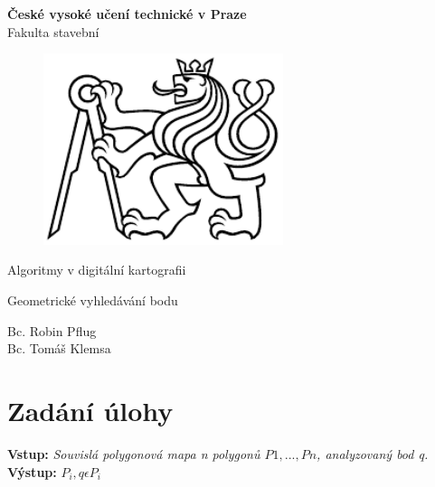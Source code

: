 \documentclass[a4paper, 12pt]{article}
\begin{document}
\begin{titlepage}
\begin{center}
\noindent
\Large \textbf{České vysoké učení technické v Praze }\\ Fakulta stavební
\vspace{5cm}

\huge

\begin{figure}[h!]
	\centering
	\includegraphics[width=7cm]{logo.png}
\end{figure}

\vspace{0.5cm}

Algoritmy v digitální kartografii \\

\vspace{3cm}

\Huge  
Geometrické vyhledávání bodu\\

\vspace{2cm}

\Large
Bc. Robin Pflug \\
Bc. Tomáš Klemsa \\

\end{center}

\end{titlepage}




\pagestyle{plain}     %
\setcounter{page}{1}  %

\tableofcontents
\newpage

\section{Zadání úlohy}

\textbf{Vstup:} \textit{Souvislá polygonová mapa n polygonů ${P1, ..., Pn}$, analyzovaný bod q.}\\
\textbf{Výstup:} 	$P_i , q \epsilon P_i$\\
\end{document}
